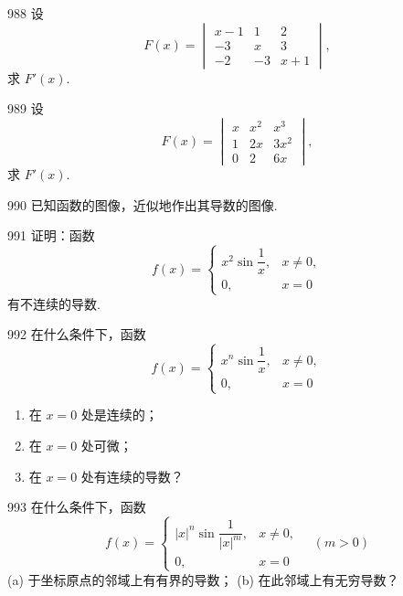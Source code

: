 \begin{prob}[M]{988}
设
\[
F(x) = \begin{vmatrix}
x - 1 & 1 & 2 \\
-3 & x & 3 \\
-2 & -3 & x + 1
\end{vmatrix},
\]
求 $F'(x)$.
\end{prob}

\begin{prob}[M]{989}
设
\[
F(x) = \begin{vmatrix}
x & x^2 & x^3 \\
1 & 2x & 3x^2 \\
0 & 2 & 6x
\end{vmatrix},
\]
求 $F'(x)$.
\end{prob}

\begin{prob}[M]{990}
已知函数的图像，近似地作出其导数的图像.
\end{prob}

\begin{prob}[M]{991}
证明：函数
\[
f(x) = \begin{cases}
x^2 \sin \dfrac{1}{x}, & x \neq 0, \\
0, & x = 0
\end{cases}
\]
有不连续的导数.
\end{prob}

\begin{prob}[L]{992}
在什么条件下，函数
\[
f(x) = \begin{cases}
x^n \sin \dfrac{1}{x}, & x \neq 0, \\
0, & x = 0
\end{cases}
\]
\begin{enumerate}[label=(\alph*), itemsep=2pt, topsep=3pt]
\item 在 $x = 0$ 处是连续的；
\item 在 $x = 0$ 处可微；
\item 在 $x = 0$ 处有连续的导数？
\end{enumerate}
\end{prob}

\begin{prob}[M]{993}
在什么条件下，函数
\[
f(x) = \begin{cases}
|x|^n \sin \dfrac{1}{|x|^m}, & x \neq 0, \\
0, & x = 0
\end{cases}
\quad (m > 0)
\]
(a) 于坐标原点的邻域上有有界的导数； \qquad (b) 在此邻域上有无穷导数？
\end{prob}

